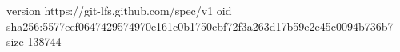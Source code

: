 version https://git-lfs.github.com/spec/v1
oid sha256:5577eef0647429574970e161c0b1750cbf72f3a263d17b59e2e45c0094b736b7
size 138744

